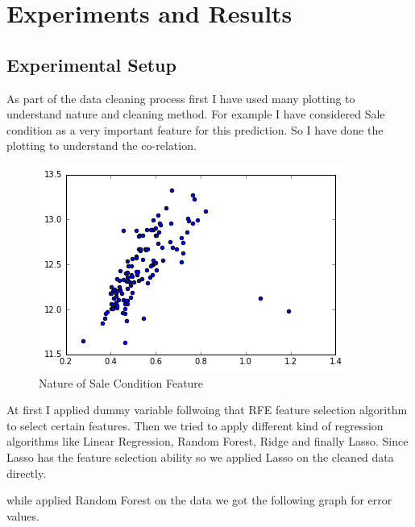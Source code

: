 \documentclass[fleqn,10pt]{SelfArx} %
\begin{document}
\section{Experiments and Results}

\subsection{Experimental Setup}

As part of the data cleaning process first I have used many plotting to understand nature and cleaning method. 
For example I have considered Sale condition as a very important feature for this prediction. So I have done the plotting to understand the co-relation.

\begin{figure}[ht]\centering %
\includegraphics[width=\linewidth]{Figure3}
\caption{Nature of Sale Condition Feature}
\label{fig:Figure3}
\end{figure}

At first I applied dummy variable follwoing that RFE feature selection algorithm to select certain features.  Then we tried to apply different kind of regression algorithms like Linear Regression, Random Forest, Ridge and finally Lasso. Since Lasso has the feature selection ability so we applied Lasso on the cleaned data directly.

while applied Random Forest on the data we got the following graph for error values.
\end{document}
